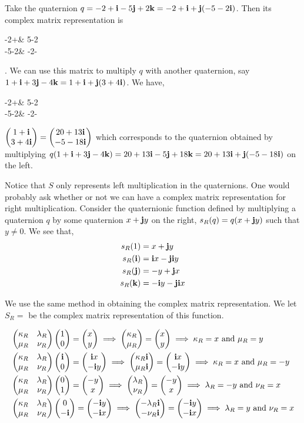 \begin{ex}
	Take the quaternion $q = -2+\ib-5\jb+2\kb = -2+\ib + \jb(-5-2\ib)$. Then its complex matrix representation is 
	\begin{pmatrix}
		-2+\ib & 5-2\ib \\
		-5-2\ib & -2-\ib
	\end{pmatrix}.
	We can use this matrix to multiply $q$ with another quaternion, say $1+\ib+3\jb-4\kb = 1+\ib + \jb(3+4\ib)$. We have, 
	\begin{pmatrix}
		-2+\ib & 5-2\ib \\
		-5-2\ib & -2-\ib
	\end{pmatrix}
	$\vectC{1+\ib}{3+4\ib} = \vectC{20+13\ib}{-5-18\ib}$ which corresponds to the quaternion obtained by multiplying $q(1+\ib+3\jb-4\kb) = 20+13\ib-5\jb+18\kb = 20+13\ib+\jb(-5-18\ib)$ on the left.
\end{ex}
Notice that $S$ only represents left multiplication in the quaternions. One would probably ask whether or not we can have a complex matrix representation for right multiplication.
\newline
Consider the quaternionic function defined by multiplying a quaternion $q$ by some quaternion $x+\jb y$ on the right, $s_R(q) = q(x+\jb y)$ such that $y\neq 0$. We see that,
\begin{align*}
	s_R(1) &= x+\jb y \\
	s_R(\ib) &= \ib x - \jb\ib y \\
	s_R(\jb) &= -y + \jb x \\
	s_R(\kb) &= -\ib y -\jb\ib x 
\end{align*}

We use the same method in obtaining the complex matrix representation. We let $S_R = $ \krmat be the complex matrix representation of this function. 

\begin{align*}
	&\krmat \vectC{1}{0} = \vectC{x}{y} \implies \vectC{\kappa_R}{\mu_R} = \vectC{x}{y} \implies \kappa_R = x \text{ and } \mu_R = y \\
	&\krmat \vectC{\ib}{0} = \vectC{\ib x}{-\ib y} \implies \vectC{\kappa_R\ib}{\mu_R\ib} = \vectC{\ib x}{-\ib y} \implies \kappa_R = x \text{ and } \mu_R = -y \\ 
	&\krmat \vectC{0}{1} = \vectC{-y}{x} \implies \vectC{\lambda_R}{\nu_R} = \vectC{-y}{x} \implies \lambda_R = -y \text{ and } \nu_R = x \\
	&\krmat \vectC{0}{-\ib} = \vectC{-\ib y}{-\ib x} \implies \vectC{-\lambda_R\ib}{-\nu_R\ib} = \vectC{-\ib y}{-\ib x} \implies \lambda_R = y \text{ and } \nu_R = x 
\end{align*}

